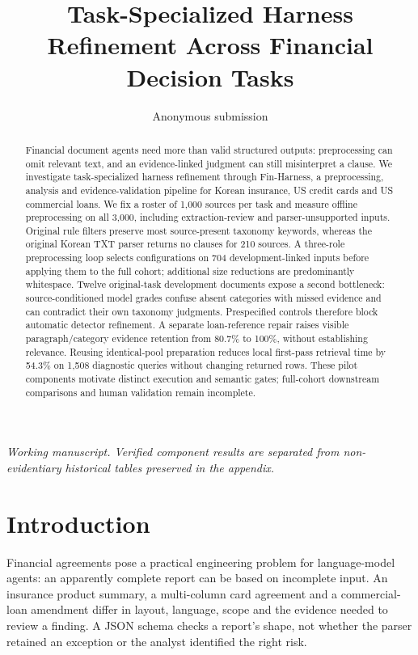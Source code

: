 \documentclass[11pt]{article}
\title{Task-Specialized Harness Refinement Across Financial Decision Tasks}
\author{Anonymous submission}
\begin{document}
\maketitle

\begin{abstract}
Financial document agents need more than valid structured outputs:
preprocessing can omit relevant text, and an evidence-linked judgment can
still misinterpret a clause. We investigate task-specialized harness
refinement through Fin-Harness, a preprocessing, analysis and
evidence-validation pipeline for Korean insurance, US credit cards and
US commercial loans. We fix a roster of 1,000 sources per task and
measure offline preprocessing on all 3,000, including extraction-review
and parser-unsupported inputs. Original rule filters preserve most
source-present taxonomy keywords, whereas the original Korean TXT parser
returns no clauses for 210 sources. A three-role preprocessing loop
selects configurations on 704 development-linked inputs before applying
them to the full cohort; additional size reductions are predominantly
whitespace. Twelve original-task development documents expose a second
bottleneck: source-conditioned model grades confuse absent categories
with missed evidence and can contradict their own taxonomy judgments.
Prespecified controls therefore block automatic detector refinement.
A separate loan-reference repair raises visible paragraph/category
evidence retention from 80.7\% to 100\%, without establishing relevance.
Reusing identical-pool preparation reduces local first-pass retrieval time
by 54.3\% on 1,508 diagnostic queries without changing returned rows.
These pilot components motivate distinct execution and semantic gates;
full-cohort downstream comparisons and human validation remain incomplete.
\end{abstract}

\noindent\textit{Working manuscript. Verified component results are separated
from non-evidentiary historical tables preserved in the appendix.}

\section{Introduction}
Financial agreements pose a practical engineering problem for language-model
agents: an apparently complete report can be based on incomplete input.
An insurance product summary, a multi-column card agreement and a
commercial-loan amendment differ in layout, language, scope and the evidence
needed to review a finding. A JSON schema checks a report's shape, not whether
the parser retained an exception or the analyst identified the right risk.
\end{document}
